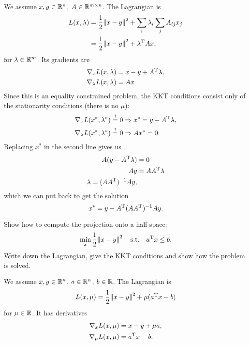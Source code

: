 \documentclass{article}
\begin{document}
We assume \(x, y \in \mathbb{R}^n\), \(A \in \mathbb{R}^{m \times n}\). The Lagrangian is
\begin{align*}
  L(x, \lambda) &= \frac{1}{2} \enVert{x - y}^2 + \sum_i \lambda_i \sum_j A_{ij} x_j \\
                &= \frac{1}{2} \enVert{x - y}^2 + \T{\lambda} A x,
\end{align*}
for \(\lambda \in \mathbb{R}^m\). Its gradients are
\begin{align*}
  \nabla_x L(x, \lambda) &= x - y + A^{\mathrm{T}} \lambda, \\
  \nabla_\lambda L(x, \lambda) &= A x.
\end{align*}
Since this is an equality constrained problem, the KKT conditions consist only of the stationarity
conditions (there is no \(\mu\)):
\begin{align*}
  \nabla_x L(x^*, \lambda^*) \overset{!}{=} 0 &\Rightarrow x^* = y - A^{\mathrm{T}} \lambda, \\
  \nabla_\lambda L(x^*, \lambda^*) \overset{!}{=} 0 &\Rightarrow A x^* = 0.
\end{align*}
Replacing \(x^*\) in the second line gives us
\begin{align*}
  A(y - A^{\mathrm{T}} \lambda) &= 0 \\
  Ay &= A A^{\mathrm{T}} \lambda \\
  \lambda = (A A^{\mathrm{T}})^{-1} A y,
\end{align*}
which we can put back to get the solution
\begin{equation*}
  x^* = y - A^{\mathrm{T}} (A A^{\mathrm{T}})^{-1} A y.
\end{equation*}


\begin{question}
  Show how to compute the projection onto a half space:
  \[
    \min_x \frac{1}{2} \enVert{x-y}^2 \quad \text{s.t.} \quad \T{a}x \leq b.
  \]
  Write down the Lagrangian, give the KKT conditions and show how the
  problem is solved.
\end{question}

We assume \(x, y \in \mathbb{R}^n\), \(a \in \mathbb{R}^n\), \(b \in \mathbb{R}\).  The Lagrangian is
\begin{equation*}
  L(x, \mu) = \frac{1}{2} \enVert{x-y}^2 + \mu(\T{a}x - b)
\end{equation*}
for \(\mu \in \mathbb{R}\).  It has derivatives
\begin{align*}
  \nabla_x L(x, \mu) &= x - y + \mu a, \\
  \nabla_\mu L(x, \mu) &= a^{\mathrm{T}} x - b.
\end{align*}
\end{document}
